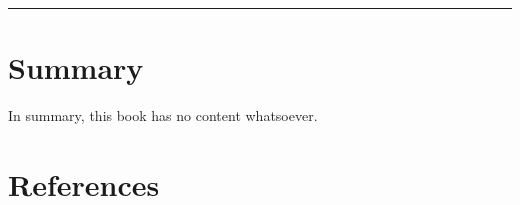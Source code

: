 \documentclass[
  letterpaper,
  DIV=11,
  numbers=noendperiod]{scrreprt}
\begin{document}
\begin{center}\rule{0.5\linewidth}{0.5pt}\end{center}


\chapter{Summary}\label{summary}

In summary, this book has no content whatsoever.


\chapter*{References}\label{references}


\label{refs}
\end{document}
